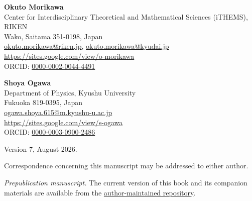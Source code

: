 \clearpage
\thispagestyle{empty}

\vspace*{\fill}

{\small
\noindent
\textbf{Okuto Morikawa}\\
Center for Interdisciplinary Theoretical and Mathematical Sciences
(iTHEMS), RIKEN\\
Wako, Saitama 351-0198, Japan\\
\href{mailto:okuto.morikawa@riken.jp}
{okuto.morikawa@riken.jp},
\href{mailto:okuto.morikawa@kyudai.jp}{okuto.morikawa@kyudai.jp}\\
\url{https://sites.google.com/view/o-morikawa}\\
ORCID:
\href{https://orcid.org/0000-0002-0044-4491}
{0000-0002-0044-4491}

\bigskip

\noindent
\textbf{Shoya Ogawa}\\
Department of Physics, Kyushu University\\
Fukuoka 819-0395, Japan\\
\href{mailto:ogawa.shoya.615@m.kyushu-u.ac.jp}
{ogawa.shoya.615@m.kyushu-u.ac.jp}\\
\url{https://sites.google.com/view/s-ogawa}\\
ORCID:
\href{https://orcid.org/0000-0003-0900-2486}
{0000-0003-0900-2486}

\bigskip

\noindent
Version 7, August 2026.

\medskip

\noindent
Correspondence concerning this manuscript may be addressed to either
author.

\medskip
\noindent
\textit{Prepublication manuscript.}
The current version of this book and its companion materials are available
from the
\href{https://drive.google.com/drive/folders/1qR1iONTnf2iShU-10wzj6FHL45_-zuMj?usp=drive_link}
{author-maintained repository}.
}

\vspace*{\fill}
\clearpage